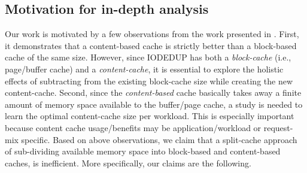 \subsection{Motivation for in-depth analysis}
Our work is motivated by a few observations from the work
presented in \cite{iodedup}.
First, it demonstrates that a content-based cache
is strictly better than a block-based cache of the same size. However, since
IODEDUP has both a \textit{block-cache} (i.e., page/buffer cache)
and a \textit{content-cache}, it is
essential to explore the holistic effects of subtracting from the existing
block-cache size while creating the new content-cache.
Second, since the \textit{content-based} cache
basically takes away a finite amount of memory space available
to the buffer/page cache, a study is needed to learn the
optimal content-cache size per workload. This is especially important
because content cache usage/benefits may be application/workload
or request-mix specific.
Based on above observations, we claim
that a split-cache approach of sub-dividing available
memory space into block-based and content-based caches, is inefficient.
More specifically, our claims are the following.
